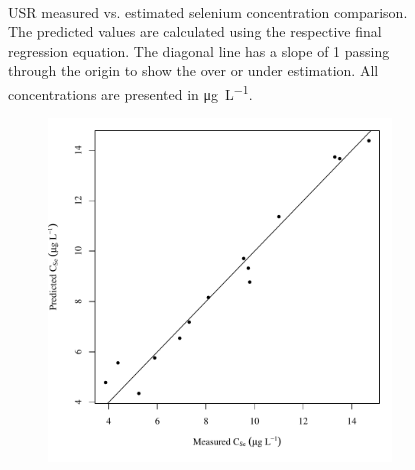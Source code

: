 \begin{linenumbers}
\begin{landscape}
\begin{figure}
\begin{subfigure}{0.7\textwidth}
		\end{subfigure}\\
		\caption[USR measured vs. estimated selenium concentration comparison.]{USR measured vs. estimated selenium concentration comparison.  The predicted values are calculated using the respective final regression equation.  The diagonal line has a slope of 1 passing through the origin to show the over or under estimation.  All concentrations are presented in \si{\micro\gram\per\liter}.}
		\label{fig:concPredVMeas_US}
	\end{figure}
\end{landscape}

\subfiguremid
\begin{landscape}
	\begin{figure}
		\begin{subfigure}{0.7\textwidth}
			\centering
			\includegraphics[width=\tableCustomSize]{"Figures/Results_USR/Stochastic/Conc Model pred v meas U167"}
		\end{subfigure}%
		\begin{subfigure}{0.7\textwidth}
			\centering

\end{subfigure}
\end{figure}
\end{landscape}
\end{linenumbers}
